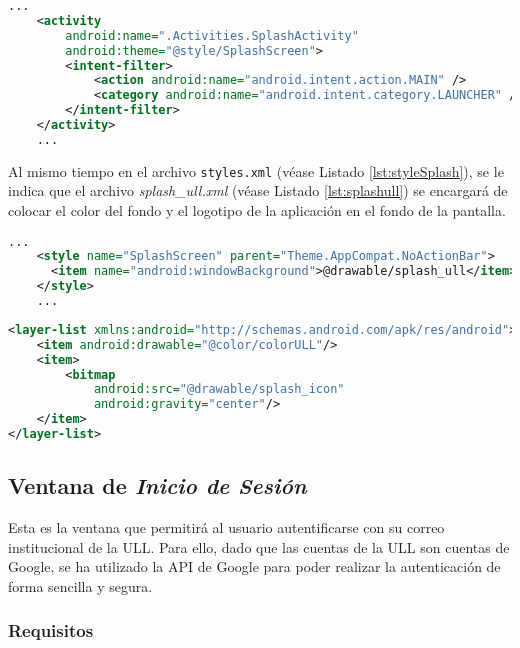 \begin{lstlisting}[language=XML,caption={Fichero \texttt{AndroidManifest.xml}, activity que inicia la aplicación.}, label={lst:manifestInicio}]
    ...
    <activity
        android:name=".Activities.SplashActivity"
        android:theme="@style/SplashScreen">
        <intent-filter> 
            <action android:name="android.intent.action.MAIN" />
            <category android:name="android.intent.category.LAUNCHER" />
        </intent-filter>
    </activity>
    ...
\end{lstlisting}

Al mismo tiempo en el archivo \texttt{styles.xml} (véase Listado \ref{lst:styleSplash}), se le indica que el archivo \textit{splash\_ull.xml} (véase Listado \ref{lst:splashull}) se encargará de colocar el color del fondo y el logotipo de la aplicación en el fondo de la pantalla. 

\begin{lstlisting}[language=XML,caption={Fichero \texttt{styles.xml}, estilo de la \textit{Splash Screen}.}, label={lst:styleSplash}]
    ...
    <style name="SplashScreen" parent="Theme.AppCompat.NoActionBar">
      <item name="android:windowBackground">@drawable/splash_ull</item>
    </style>
    ...
\end{lstlisting}

\begin{lstlisting}[language=XML,caption={Fichero  \textit{splash\_ull.xml}, configuración del color de fondo y el logotipo de la aplicación. }, label={lst:splashull}]
<layer-list xmlns:android="http://schemas.android.com/apk/res/android">
    <item android:drawable="@color/colorULL"/>
    <item>
        <bitmap
            android:src="@drawable/splash_icon"
            android:gravity="center"/>
    </item>
</layer-list>
\end{lstlisting}

\subsection{Ventana de \textit{Inicio de Sesión} }

Esta es la ventana que permitirá al usuario autentificarse con su correo institucional de la ULL. Para ello, dado que las cuentas de la ULL son cuentas de Google, se ha utilizado la API de Google para poder realizar la autenticación de forma sencilla y segura.

\subsubsection{ Requisitos }  

